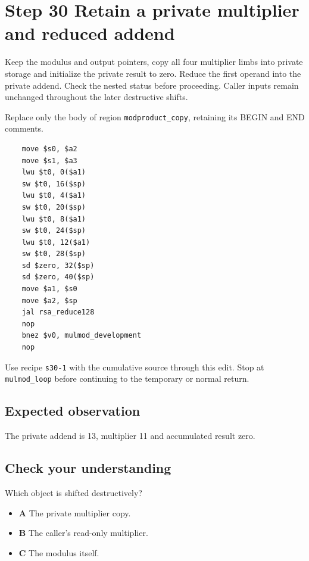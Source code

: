 \section{Step 30 Retain a private multiplier and reduced addend}\label{rsa-s30}

Keep the modulus and output pointers, copy all four multiplier limbs into private storage and initialize the private result to zero. Reduce the first operand into the private addend. Check the nested status before proceeding. Caller inputs remain unchanged throughout the later destructive shifts.

Replace only the body of region \texttt{modproduct\_copy}, retaining its BEGIN and END comments.

\begin{verbatim}
    move $s0, $a2
    move $s1, $a3
    lwu $t0, 0($a1)
    sw $t0, 16($sp)
    lwu $t0, 4($a1)
    sw $t0, 20($sp)
    lwu $t0, 8($a1)
    sw $t0, 24($sp)
    lwu $t0, 12($a1)
    sw $t0, 28($sp)
    sd $zero, 32($sp)
    sd $zero, 40($sp)
    move $a1, $s0
    move $a2, $sp
    jal rsa_reduce128
    nop
    bnez $v0, mulmod_development
    nop
\end{verbatim}

Use recipe \texttt{s30-1} with the cumulative source through this edit. Stop at \texttt{mulmod\_loop} before continuing to the temporary or normal return.

\subsection{Expected observation}
The private addend is 13, multiplier 11 and accumulated result zero.

\subsection{Check your understanding}
Which object is shifted destructively?

\begin{itemize}
\item \textbf{A} The private multiplier copy.
\item \textbf{B} The caller's read-only multiplier.
\item \textbf{C} The modulus itself.
\end{itemize}
